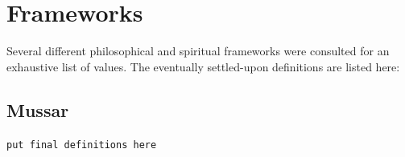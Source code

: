 \documentclass[
]{book}
\begin{document}
\hypertarget{frameworks}{%
\chapter{Frameworks}\label{frameworks}}

Several different philosophical and spiritual frameworks were consulted for an exhaustive list of values. The eventually settled-upon definitions are listed here:

\hypertarget{mussar}{%
\section{Mussar}\label{mussar}}

\texttt{put\ final\ definitions\ here}

  
\end{document}
